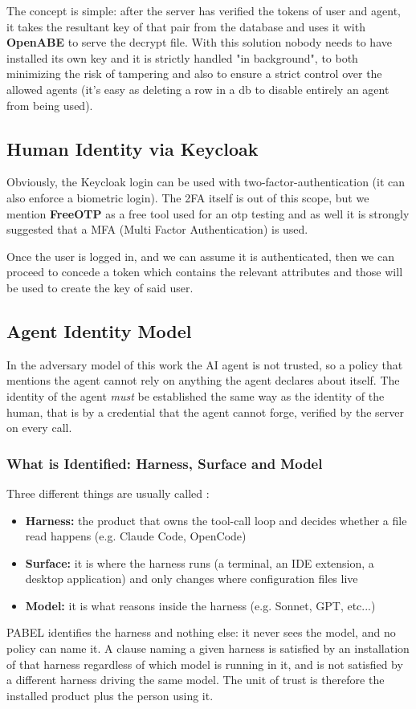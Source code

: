 The concept is simple: after the server has verified the tokens of user and agent, it takes the resultant key of that pair from the database and uses it with \textbf{OpenABE} to serve the decrypt file.
With this solution nobody needs to have installed its own key and it is strictly handled "in background", to both minimizing the risk of tampering and also to ensure a strict control over the allowed agents (it's easy as deleting a row in a db to disable entirely an agent from being used).

\subsection{Human Identity via Keycloak}
Obviously, the Keycloak login can be used with two-factor-authentication (it can also enforce a biometric login). The 2FA itself is out of this scope, but we mention \textbf{FreeOTP} as a free tool used for an otp testing and as well it is strongly suggested that a MFA (Multi Factor Authentication) is used.

Once the user is logged in, and we can assume it is authenticated, then we can proceed to concede a token which contains the relevant attributes and those will be used to create the key of said user.

\subsection{Agent Identity Model}\label{Agent Identity Model}
In the adversary model of this work the AI agent is not trusted, so a policy that mentions the agent cannot rely on anything the agent declares about itself.
The identity of the agent \textit{must} be established the same way as the identity of the human, that is by a credential that the agent cannot forge, verified by the server on every call.

\subsubsection{What is Identified: Harness, Surface and Model}
Three different things are usually called :
\begin{itemize}
  \item \textbf{Harness:} the product that owns the tool-call loop and decides whether a file read happens (e.g. Claude Code, OpenCode)
  \item \textbf{Surface:} it is where the harness runs (a terminal, an IDE extension, a desktop application) and only changes where configuration files live
  \item \textbf{Model:} it is what reasons inside the harness (e.g. Sonnet, GPT, etc...)
\end{itemize}
PABEL identifies the harness and nothing else: it never sees the model, and no policy can name it. A clause naming a given harness is satisfied by an installation of that harness regardless of which model is running in it, and is not satisfied by a different harness driving the same model.
The unit of trust is therefore the installed product plus the person using it.

